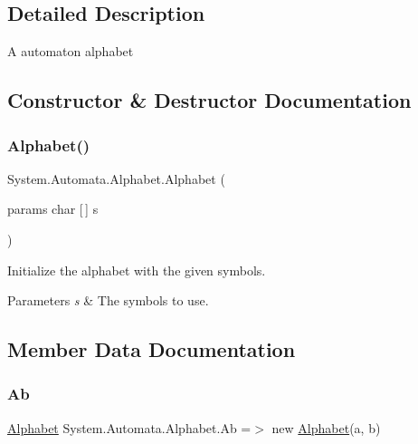 \subsection{Detailed Description}
A automaton alphabet 



\subsection{Constructor \& Destructor Documentation}
\mbox{\label{class_system_1_1_automata_1_1_alphabet_a890f76aaecd05e71d6ad4518cdb1cbad}} 
\subsubsection{\texorpdfstring{Alphabet()}{Alphabet()}}
{\footnotesize\ttfamily System.\+Automata.\+Alphabet.\+Alphabet (\begin{DoxyParamCaption}\item[{params char \mbox{[}$\,$\mbox{]}}]{s }\end{DoxyParamCaption})}



Initialize the alphabet with the given symbols. 


\begin{DoxyParams}{Parameters}
{\em s} & The symbols to use.\\
\hline
\end{DoxyParams}


\subsection{Member Data Documentation}
\mbox{\label{class_system_1_1_automata_1_1_alphabet_a5040c44fbca9ecf1348714c74b848b1d}} 
\subsubsection{\texorpdfstring{Ab}{Ab}}
{\footnotesize\ttfamily \mbox{\hyperlink{class_system_1_1_automata_1_1_alphabet}{Alphabet}} System.\+Automata.\+Alphabet.\+Ab =$>$ new \mbox{\hyperlink{class_system_1_1_automata_1_1_alphabet}{Alphabet}}(\textquotesingle{}a\textquotesingle{}, \textquotesingle{}b\textquotesingle{})\hspace{0.3cm}{\ttfamily [static]}}



